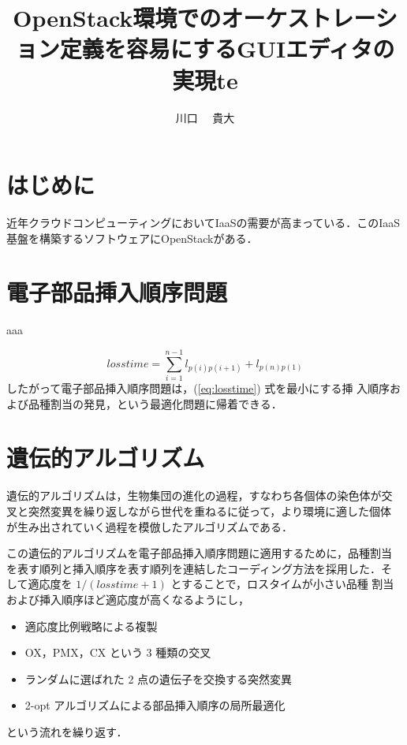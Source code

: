 \documentclass[a4j]{jarticle}
\title{OpenStack環境でのオーケストレーション定義を容易にするGUIエディタの実現te}
\author{川口 ~~貴大}
\begin{document}
\begin{Abstract}
 
 \section{はじめに}
 近年クラウドコンピューティングにおいてIaaSの需要が高まっている．このIaaS基盤を構築するソフトウェアにOpenStackがある．
 \section{電子部品挿入順序問題}
 aaa

 \begin{equation}
  losstime = \sum_{i = 1}^{n - 1}l_{p(i) p(i + 1)} + l_{p(n) p(1)}
   \label{eq:losstime}
 \end{equation}
 したがって電子部品挿入順序問題は，(\ref{eq:losstime}) 式を最小にする挿
 入順序および品種割当の発見，という最適化問題に帰着できる．

 \section{遺伝的アルゴリズム}
 遺伝的アルゴリズムは，生物集団の進化の過程，すなわち各個体の染色体が交
 叉と突然変異を繰り返しながら世代を重ねるに従って，より環境に適した個体
 が生み出されていく過程を模倣したアルゴリズムである．

 この遺伝的アルゴリズムを電子部品挿入順序問題に適用するために，品種割当
 を表す順列と挿入順序を表す順列を連結したコーディング方法を採用した．そ
 して適応度を $1 / (losstime + 1)$ とすることで，ロスタイムが小さい品種
 割当および挿入順序ほど適応度が高くなるようにし，
 \begin{itemize} \vspace*{-1zh}
  \item 適応度比例戦略による複製 \vspace*{-1zh}
  \item OX，PMX，CX という 3 種類の交叉 \vspace*{-1zh}
  \item ランダムに選ばれた 2 点の遺伝子を交換する突然変異 \vspace*{-1zh}
  \item 2-opt アルゴリズムによる部品挿入順序の局所最適化 \vspace*{-1zh}
 \end{itemize}
 という流れを繰り返す．
 

\end{Abstract}
\end{document}
